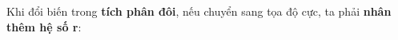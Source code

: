 \documentclass[preview]{standalone}
\begin{document}
\begin{center}
Khi đổi biến trong \textbf{tích phân đôi}, nếu chuyển sang tọa độ cực, ta phải \textbf{nhân thêm hệ số r}:
\end{center}
\end{document}
